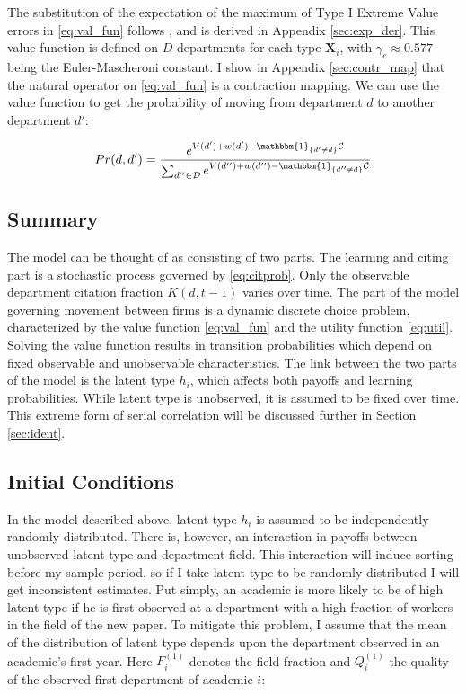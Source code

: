The substitution of the expectation of the maximum of Type I Extreme Value errors
in \eqref{eq:val_fun} follows \citet{rust1987optimal}, and is derived in Appendix \ref{sec:exp_der}. This value function
 is defined on $D$ departments for each type $\mathbf{X}_i$, with $\gamma_e \approx 0.577$ being the Euler-Mascheroni constant. I
show in Appendix \ref{sec:contr_map} that the natural operator on \eqref{eq:val_fun} is a
contraction mapping. We can use the value function to get the
probability of moving from department $d$ to another department $d'$:

\begin{equation}
    Pr(d,d') = \frac{e^{V(d') + w(d') - \mathbbm{1}_{\{d'\neq d\}}\mathcal{C}}}{\sum_{d'' \in \mathcal{D}} e^{V(d'') + w(d'') - \mathbbm{1}_{\{d''\neq d\}} \mathcal{C}}}
    \label{eq:trans}
\end{equation}

\subsection{Summary} 

The model can be thought of as consisting of two parts.  The learning and citing part is 
a stochastic process governed by \eqref{eq:citprob}.  Only the observable department 
citation fraction $K(d,t-1)$ varies over time.\footnotemark{}
The part of the model governing movement between firms is a dynamic discrete
choice problem, characterized by the value
function \eqref{eq:val_fun} and the utility function \eqref{eq:util}.
 Solving the value function results in transition probabilities
 which depend on fixed observable and unobservable characteristics.  The link between the two parts
 of the model is the latent type $h_i$, which affects both
payoffs and learning probabilities.  While latent type is unobserved, it is assumed
to be fixed over time.  This extreme form of serial correlation
 will be discussed further in Section \ref{sec:ident}.

\subsection{Initial Conditions}
\label{sec:init_cond}

In the model described above, latent type $h_i$ is assumed to be
independently randomly distributed. There is, however, an interaction in
payoffs between unobserved latent type and department field.
This interaction will induce sorting before my sample period, so if I
take latent type to be randomly distributed I will get inconsistent
estimates. Put simply, an academic is more likely to be of high latent type if he is
first observed at a department with a high fraction of workers in the field of
the new paper. To mitigate this
problem, I assume that the mean of the distribution of latent
type depends upon the department observed in an academic's first year.  Here $F^{(1)}_i$ denotes the 
field fraction and $Q^{(1)}_i$ the quality of the observed first department of academic $i$:

